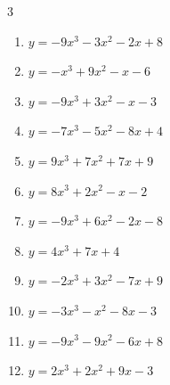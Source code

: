 \begin{multicols}{3}
\begin{enumerate}

  \item $y=-9x^{3}-3x^{2}-2x+8$


  \item $y=-x^{3}+9x^{2}-x-6$


  \item $y=-9x^{3}+3x^{2}-x-3$


\columnbreak %

  \item $y=-7x^{3}-5x^{2}-8x+4$


  \item $y=9x^{3}+7x^{2}+7x+9$


  \item $y=8x^{3}+2x^{2}-x-2$


  \item $y=-9x^{3}+6x^{2}-2x-8$


  \item $y=4x^{3}+7x+4$


  \item $y=-2x^{3}+3x^{2}-7x+9$


  \item $y=-3x^{3}-x^{2}-8x-3$


  \item $y=-9x^{3}-9x^{2}-6x+8$


  \item $y=2x^{3}+2x^{2}+9x-3$



\end{enumerate}
\end{multicols}
